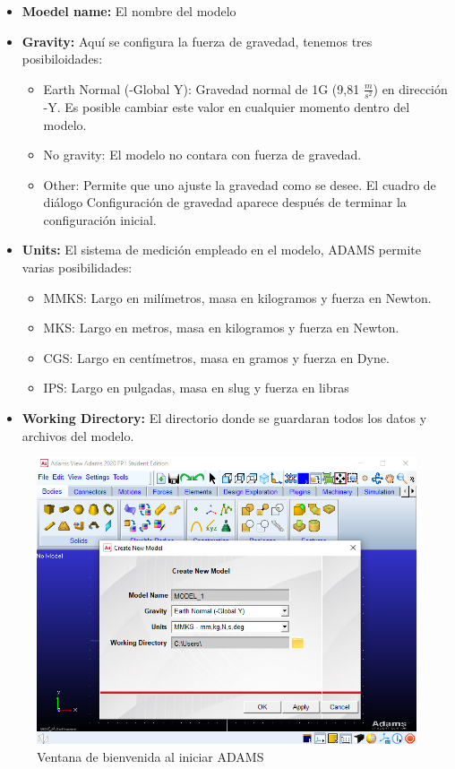                 \begin{itemize}
                    \item \textbf{Moedel name:} El nombre del modelo
                    \item \textbf{Gravity:} Aquí se configura la fuerza de gravedad, tenemos tres posibiloidades:
                           \begin{itemize}
                               \item Earth Normal (-Global Y): Gravedad normal de 1G (9,81 $\frac{m}{s^2}$) en dirección -Y. Es posible cambiar este valor en cualquier momento dentro del modelo.
                               \item No gravity: El modelo no contara con fuerza de gravedad.
                               \item Other: Permite que uno ajuste la gravedad como se desee. El cuadro de diálogo Configuración de gravedad aparece después de terminar la configuración inicial.
                           \end{itemize}
                    \item \textbf{Units:} El sistema de medición empleado en el modelo, ADAMS permite varias posibilidades:
                        \begin{itemize}
                            \item MMKS: Largo en milímetros, masa en kilogramos y fuerza en Newton.
                            \item MKS: Largo en metros, masa en kilogramos y fuerza en Newton.
                            \item CGS: Largo en centímetros, masa en gramos y fuerza en Dyne.
                            \item IPS: Largo en pulgadas, masa en slug y fuerza en libras
                        \end{itemize}
                    \item \textbf{Working Directory:} El directorio donde se guardaran todos los datos y archivos del modelo.
                \end{itemize}
            
            \begin{figure}[H]
                \centering
                \includegraphics[width=0.7\linewidth]{Main/Chapter3/Images3/adams/ventana_configuracion_inicial.png}
                \caption{Ventana de bienvenida al iniciar ADAMS}
                \label{f:Cap3-adams_window_configuracion_inicial}
            \end{figure} 
            
